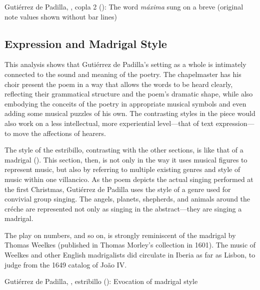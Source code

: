 {Gutiérrez de Padilla, , copla 2
(): The word \emph{máxima} sung on a breve (original note
values shown without bar lines)}

\subsection{Expression and Madrigal Style}

This analysis shows that Gutiérrez de Padilla's setting as a whole is intimately
connected to the sound and meaning of the poetry.
The chapelmaster has his choir present the poem in a way that allows the words
to be heard clearly, reflecting their grammatical structure and the poem's
dramatic shape, while also embodying the conceits of the poetry in appropriate
musical symbols and even adding some musical puzzles of his own.
The contrasting styles in the piece would also work on a less intellectual, more
experiential level---that of text expression---to move the affections of
hearers.

The style of the estribillo, contrasting with the other sections, is like that
of a madrigal ().
This section, then, is  not only in the way it uses
musical figures to represent music, but also by referring to multiple existing
genres and style of music within one villancico.
As the poem depicts the actual singing performed at the first Christmas,
Gutiérrez de Padilla uses the style of a genre used for convivial group singing.
The angels, planets, shepherds, and animals around the créche are represented
not only as singing in the abstract---they are singing a madrigal.%
\begin{Footnote}
    The play on numbers,  and so on, is strongly
    reminiscent of the madrigal  by Thomas Weelkes (published in Thomas Morley's collection
     in 1601).
    The music of Weelkes and other English madrigalists did circulate in Iberia
    as far as Lisbon, to judge from the 1649 catalog of João IV.
\end{Footnote}


{Gutiérrez de Padilla, , estribillo
(): Evocation of madrigal style}

